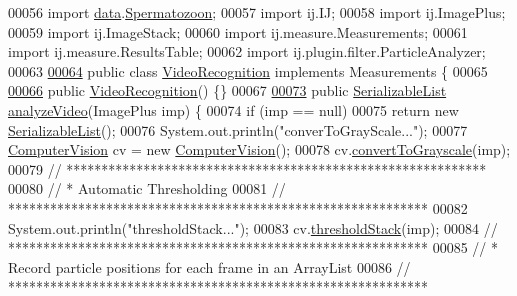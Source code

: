 \begin{DoxyCode}
00056 \textcolor{keyword}{import} \hyperlink{namespacedata}{data}.\hyperlink{classdata_1_1_spermatozoon}{Spermatozoon};
00057 \textcolor{keyword}{import} ij.IJ;
00058 \textcolor{keyword}{import} ij.ImagePlus;
00059 \textcolor{keyword}{import} ij.ImageStack;
00060 \textcolor{keyword}{import} ij.measure.Measurements;
00061 \textcolor{keyword}{import} ij.measure.ResultsTable;
00062 \textcolor{keyword}{import} ij.plugin.filter.ParticleAnalyzer;
00063 
\hypertarget{_video_recognition_8java_source_l00064}{}\hyperlink{classfunctions_1_1_video_recognition}{00064} \textcolor{keyword}{public} \textcolor{keyword}{class }\hyperlink{classfunctions_1_1_video_recognition}{VideoRecognition} \textcolor{keyword}{implements} Measurements \{
00065 
\hypertarget{_video_recognition_8java_source_l00066}{}\hyperlink{classfunctions_1_1_video_recognition_a7901d0cc46df7762032f67cd822e30a5}{00066}   \textcolor{keyword}{public} \hyperlink{classfunctions_1_1_video_recognition_a7901d0cc46df7762032f67cd822e30a5}{VideoRecognition}() \{\}
00067   
\hypertarget{_video_recognition_8java_source_l00073}{}\hyperlink{classfunctions_1_1_video_recognition_a5472ba1ca2aba8ebc35bcb63634421e1}{00073}   \textcolor{keyword}{public} \hyperlink{classdata_1_1_serializable_list}{SerializableList} \hyperlink{classfunctions_1_1_video_recognition_a5472ba1ca2aba8ebc35bcb63634421e1}{analyzeVideo}(ImagePlus imp) \{
00074     \textcolor{keywordflow}{if} (imp == null)
00075       \textcolor{keywordflow}{return} \textcolor{keyword}{new} \hyperlink{classdata_1_1_serializable_list}{SerializableList}();
00076     System.out.println(\textcolor{stringliteral}{"converToGrayScale..."});
00077     \hyperlink{classfunctions_1_1_computer_vision}{ComputerVision} cv = \textcolor{keyword}{new} \hyperlink{classfunctions_1_1_computer_vision}{ComputerVision}();
00078     cv.\hyperlink{classfunctions_1_1_computer_vision_a4d0fe516e9ef71c60ba67150cf288030}{convertToGrayscale}(imp);
00079     \textcolor{comment}{// ************************************************************}
00080     \textcolor{comment}{// * Automatic Thresholding}
00081     \textcolor{comment}{// ************************************************************}
00082     System.out.println(\textcolor{stringliteral}{"thresholdStack..."});
00083     cv.\hyperlink{classfunctions_1_1_computer_vision_a253912ee71e289051b50b08dcce6376f}{thresholdStack}(imp);
00084     \textcolor{comment}{// ************************************************************}
00085     \textcolor{comment}{// * Record particle positions for each frame in an ArrayList}
00086     \textcolor{comment}{// ************************************************************}

\end{DoxyCode}

